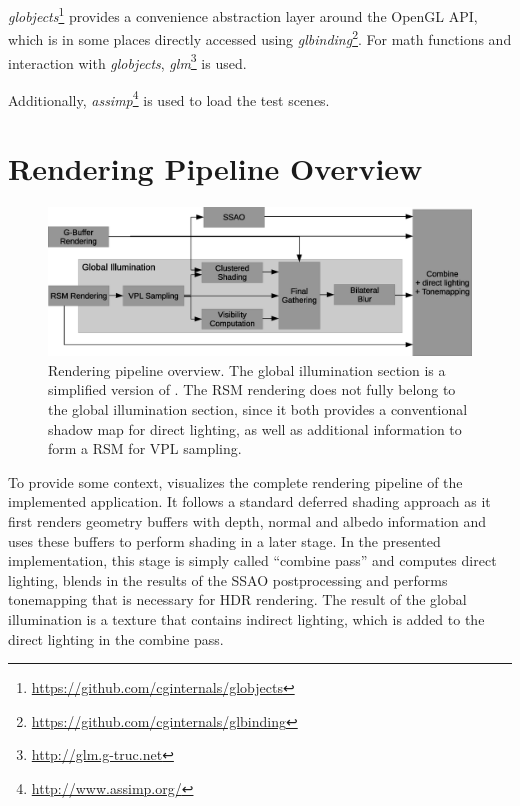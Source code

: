 \textit{globjects}\footnote{\url{https://github.com/cginternals/globjects}} provides a convenience abstraction layer around the OpenGL API, which is in some places directly accessed using \textit{glbinding}\footnote{\url{https://github.com/cginternals/glbinding}}. For math functions and interaction with \textit{globjects}, \textit{glm}\footnote{\url{http://glm.g-truc.net}} is used.

Additionally, \textit{assimp}\footnote{\url{http://www.assimp.org/}} is used to load the test scenes.


\section{Rendering Pipeline Overview}

\begin{figure}[h]
    \includegraphics[width=\textwidth]{graphics/Rendering_pipeline_rough}
    \caption{Rendering pipeline overview. The global illumination section is a simplified version of . The RSM rendering does not fully belong to the global illumination section, since it both provides a conventional shadow map for direct lighting, as well as additional information to form a RSM for VPL sampling.}
    \label{fig:RenderingPipelineOverview}
\end{figure}

To provide some context,  visualizes the complete rendering pipeline of the implemented application. It follows a standard deferred shading approach as it first renders geometry buffers with depth, normal and albedo information and uses these buffers to perform shading in a later stage. In the presented implementation, this stage is simply called ``combine pass'' and computes direct lighting, blends in the results of the SSAO postprocessing and performs tonemapping that is necessary for HDR rendering. The result of the global illumination is a texture that contains indirect lighting, which is added to the direct lighting in the combine pass.

